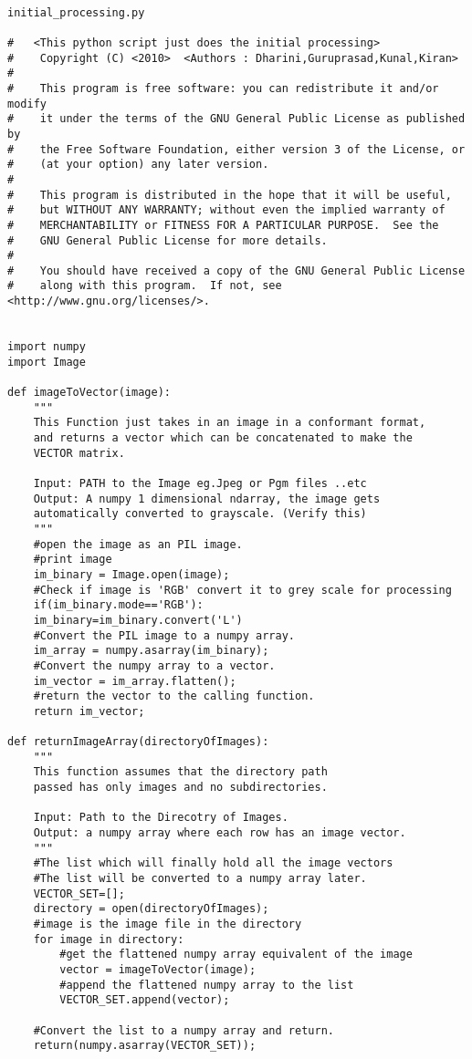 \documentclass[10pt,a4paper]{article}
\begin{document}
\begin{lstlisting}

initial_processing.py

#   <This python script just does the initial processing>
#    Copyright (C) <2010>  <Authors : Dharini,Guruprasad,Kunal,Kiran>
#
#    This program is free software: you can redistribute it and/or modify
#    it under the terms of the GNU General Public License as published by
#    the Free Software Foundation, either version 3 of the License, or
#    (at your option) any later version.
#
#    This program is distributed in the hope that it will be useful,
#    but WITHOUT ANY WARRANTY; without even the implied warranty of
#    MERCHANTABILITY or FITNESS FOR A PARTICULAR PURPOSE.  See the
#    GNU General Public License for more details.
#
#    You should have received a copy of the GNU General Public License
#    along with this program.  If not, see <http://www.gnu.org/licenses/>.


import numpy
import Image

def imageToVector(image):
    """
    This Function just takes in an image in a conformant format,
    and returns a vector which can be concatenated to make the
    VECTOR matrix.
    
    Input: PATH to the Image eg.Jpeg or Pgm files ..etc
    Output: A numpy 1 dimensional ndarray, the image gets
    automatically converted to grayscale. (Verify this)
    """
    #open the image as an PIL image.
    #print image
    im_binary = Image.open(image);
    #Check if image is 'RGB' convert it to grey scale for processing
    if(im_binary.mode=='RGB'):
	im_binary=im_binary.convert('L')	
    #Convert the PIL image to a numpy array.
    im_array = numpy.asarray(im_binary);
    #Convert the numpy array to a vector.
    im_vector = im_array.flatten();
    #return the vector to the calling function.
    return im_vector;

def returnImageArray(directoryOfImages):
    """
    This function assumes that the directory path
    passed has only images and no subdirectories.
    
    Input: Path to the Direcotry of Images.
    Output: a numpy array where each row has an image vector.
    """
    #The list which will finally hold all the image vectors
    #The list will be converted to a numpy array later.
    VECTOR_SET=[];
    directory = open(directoryOfImages);
    #image is the image file in the directory
    for image in directory:
        #get the flattened numpy array equivalent of the image
        vector = imageToVector(image);
        #append the flattened numpy array to the list
        VECTOR_SET.append(vector);
        
    #Convert the list to a numpy array and return.
    return(numpy.asarray(VECTOR_SET));
     
   
    

\end{lstlisting}
\end{document}
